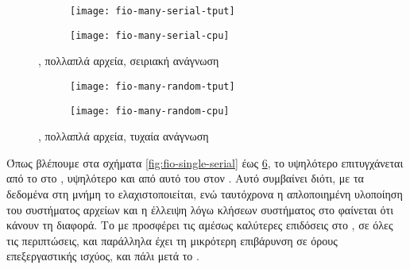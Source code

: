 \begin{figure}
    \begin{minipage}[c][\textheight]{\textwidth}
        \begin{subfigure}[c][0.5\textheight]{\textwidth}
            \caption{}
            \texttt{[image: fio-many-serial-tput]}
            \label{fig:fio-many-serial-tput}
        \end{subfigure}
        \begin{subfigure}[c][0.5\textheight]{\textwidth}
            \caption{}
            \texttt{[image: fio-many-serial-cpu]}
            \label{fig:fio-many-serial-cpu}
        \end{subfigure}
        \caption{, πολλαπλά αρχεία, σειριακή ανάγνωση}
        \label{fig:fio-many-serial}
    \end{minipage}
\end{figure}

\begin{figure}
    \begin{minipage}[c][\textheight]{\textwidth}
        \begin{subfigure}[c][0.5\textheight]{\textwidth}
            \caption{}
            \texttt{[image: fio-many-random-tput]}
            \label{fig:fio-many-random-tput}
        \end{subfigure}
        \begin{subfigure}[c][0.5\textheight]{\textwidth}
            \caption{}
            \texttt{[image: fio-many-random-cpu]}
            \label{fig:fio-many-random-cpu}
        \end{subfigure}
        \caption{, πολλαπλά αρχεία, τυχαία ανάγνωση}
        \label{fig:fio-many-random}
    \end{minipage}
\end{figure}


Όπως βλέπουμε στα σχήματα \ref{fig:fio-single-serial} έως
\ref{fig:fio-many-random}, το υψηλότερο  επιτυγχάνεται από το
 στο \osv{}, υψηλότερο και από αυτό του  στον \host{}. Αυτό
συμβαίνει διότι, με τα δεδομένα στη μνήμη το 
ελαχιστοποιείται, ενώ ταυτόχρονα η απλοποιημένη υλοποίηση του συστήματος αρχείων
και η έλλειψη  λόγω κλήσεων συστήματος στο \osv{} φαίνεται ότι
κάνουν τη διαφορά. Το \viofs{} με  προσφέρει τις αμέσως καλύτερες
επιδόσεις στο \osv{}, σε όλες τις περιπτώσεις, και παράλληλα έχει τη μικρότερη
επιβάρυνση σε όρους επεξεργαστικής ισχύος, και πάλι μετά το .

